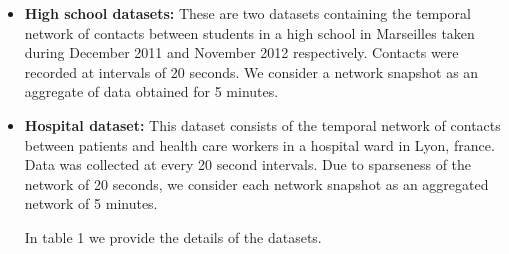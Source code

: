 \begin{itemize}
\item {\bf High school datasets:}
These are two datasets containing the temporal network of contacts between students in a high school in Marseilles taken during December 2011 and November 2012 respectively. 
Contacts were recorded at intervals of 20 seconds. We consider a network snapshot as an aggregate of data obtained for 5 minutes. 

\item {\bf Hospital dataset:}
This dataset consists of the temporal network of contacts between patients and health care workers in a hospital ward in Lyon, france. Data was collected at every 20 second intervals.
 Due to sparseness of the network of 20 seconds, we consider each network snapshot as an aggregated network of 5 minutes. 
 
 
 In table 1 we provide the details of the datasets.  
%  
 \end{itemize}
 
